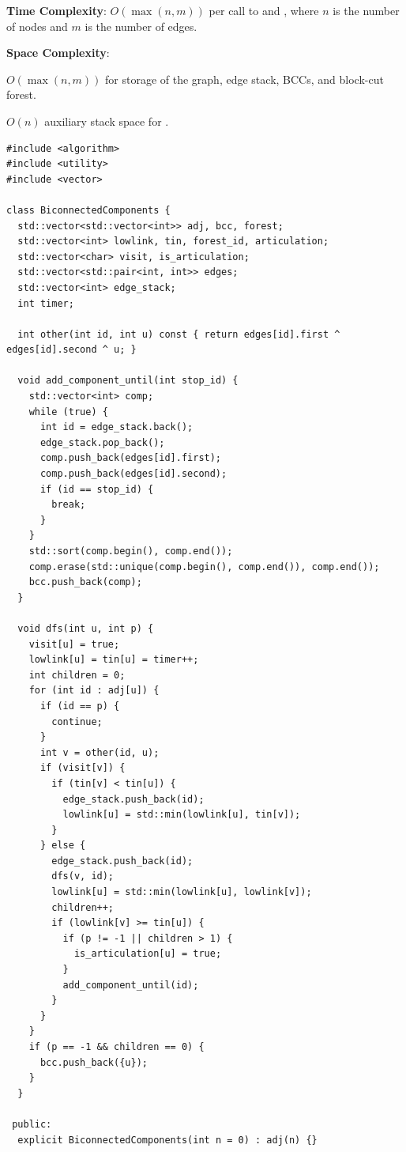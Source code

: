 \textbf{Time Complexity}: $O(\max\left(n, m\right))$ per call to  and , where $n$ is the number of nodes and $m$ is the number of edges.

\textbf{Space Complexity}:
\begin{compactitem}
  \item $O(\max\left(n, m\right))$ for storage of the graph, edge stack, BCCs, and block-cut forest.
  \item $O(n)$ auxiliary stack space for .
\end{compactitem}

\begin{lstlisting}[style=cpp]
#include <algorithm>
#include <utility>
#include <vector>

class BiconnectedComponents {
  std::vector<std::vector<int>> adj, bcc, forest;
  std::vector<int> lowlink, tin, forest_id, articulation;
  std::vector<char> visit, is_articulation;
  std::vector<std::pair<int, int>> edges;
  std::vector<int> edge_stack;
  int timer;

  int other(int id, int u) const { return edges[id].first ^ edges[id].second ^ u; }

  void add_component_until(int stop_id) {
    std::vector<int> comp;
    while (true) {
      int id = edge_stack.back();
      edge_stack.pop_back();
      comp.push_back(edges[id].first);
      comp.push_back(edges[id].second);
      if (id == stop_id) {
        break;
      }
    }
    std::sort(comp.begin(), comp.end());
    comp.erase(std::unique(comp.begin(), comp.end()), comp.end());
    bcc.push_back(comp);
  }

  void dfs(int u, int p) {
    visit[u] = true;
    lowlink[u] = tin[u] = timer++;
    int children = 0;
    for (int id : adj[u]) {
      if (id == p) {
        continue;
      }
      int v = other(id, u);
      if (visit[v]) {
        if (tin[v] < tin[u]) {
          edge_stack.push_back(id);
          lowlink[u] = std::min(lowlink[u], tin[v]);
        }
      } else {
        edge_stack.push_back(id);
        dfs(v, id);
        lowlink[u] = std::min(lowlink[u], lowlink[v]);
        children++;
        if (lowlink[v] >= tin[u]) {
          if (p != -1 || children > 1) {
            is_articulation[u] = true;
          }
          add_component_until(id);
        }
      }
    }
    if (p == -1 && children == 0) {
      bcc.push_back({u});
    }
  }

 public:
  explicit BiconnectedComponents(int n = 0) : adj(n) {}


\end{lstlisting}
